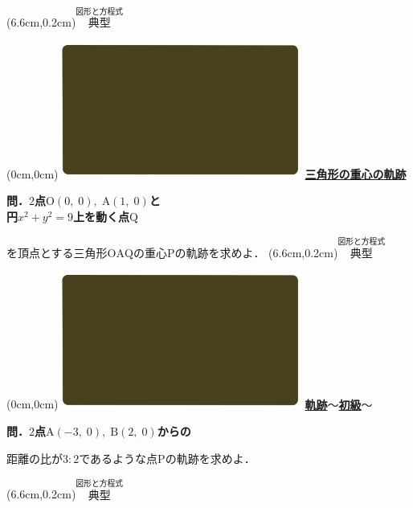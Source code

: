 \documentclass[10pt,
fleqn,
dvipdfmx,
uplatex
]{jsarticle}
\begin{document}
\at(6.6cm,0.2cm){\small\color{bradorange}$\overset{\text{図形と方程式}}{\text{典型}}$}


\newpage



\at(0cm,0cm){\includegraphics[width=8cm,bb=0 0 1920 1080]{./media_local/smart_background/図形と方程式.jpeg}}
{\color{orange}\bf\boldmath\LARGE\underline{三角形の重心の軌跡}}\vspace{0.3zw}

\large 
\bf\boldmath 問．$2$点$\text{O}\left(0,\;0\right),\;\text{A}\left(1,\;0\right)$と\\
\hfill 円$x^2+y^2=9$上を動く点$\text{Q}$

\LARGE
を頂点とする三角形$\text{OAQ}$の重心$\text{P}$の軌跡を求めよ．
\at(6.6cm,0.2cm){\small\color{bradorange}$\overset{\text{図形と方程式}}{\text{典型}}$}


\newpage



\at(0cm,0cm){\includegraphics[width=8cm,bb=0 0 1920 1080]{./media_local/smart_background/図形と方程式.jpeg}}
{\color{orange}\bf\boldmath\huge\underline{軌跡$〜$初級$〜$}}\vspace{0.5zw}

\large 
\bf\boldmath 問．$2$点$\text{A}\left(-3,\;0\right),\;\text{B}\left(2,\;0\right)$からの

\LARGE 
距離の比が$3:2$であるような点$\text{P}$の軌跡を求めよ．

\at(6.6cm,0.2cm){\small\color{bradorange}$\overset{\text{図形と方程式}}{\text{典型}}$}


\newpage
\end{document}
